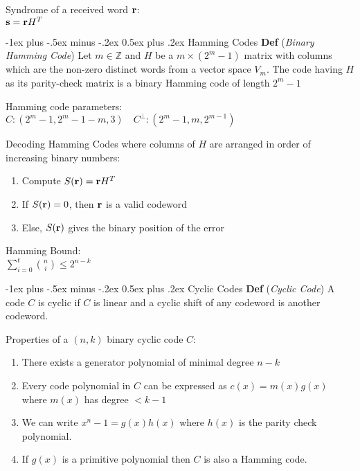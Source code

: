 \documentclass[12pt,landscape]{article}
\makeatletter
\renewcommand{\section}{\@startsection{section}{1}{0mm}%
                                {-1ex plus -.5ex minus -.2ex}%
                                {0.5ex plus .2ex}%
                                {\normalfont\normalsize\bfseries}}
\newcommand{\tab}{\hspace{.02\textwidth}}
\newcommand{\ds}{\displaystyle}
\newcommand{\defn}[1]{\textbf{Def} (\emph{#1})}
\makeatother
\begin{document}
\begin{multicols*}{3}
Syndrome of a received word $\vb{r}$:\\
\tab $\vb{s} = \vb{r}H^T$

\section{Hamming Codes}
\defn{Binary Hamming Code} Let $m \in \mathbb{Z}$ and $H$ be a $m \times (2^m-1)$ matrix with columns which are the non-zero distinct words from a vector space $V_m$. The code having $H$ as its parity-check matrix is a binary Hamming code of length $2^m-1$

Hamming code parameters:\\
\tab $C: (2^m-1, 2^m-1-m, 3) \quad C^\perp: (2^m-1, m, 2^{m-1})$

Decoding Hamming Codes where columns of $H$ are arranged in order of increasing binary numbers:
\vspace{-0.5em}
\begin{enumerate}[itemsep=0em]
	\item Compute $S(\vb{r}) = \vb{r}H^T$
	\item If $S(\vb{r}) = 0$, then $\vb{r}$ is a valid codeword
	\item Else, $S(\vb{r})$ gives the binary position of the error 
\end{enumerate}

Hamming Bound:\\
\tab $\ds \sum_{i=0}^{t} {n \choose i} \leq 2^{n-k}$

\section{Cyclic Codes}
\defn{Cyclic Code} A code $C$ is cyclic if $C$ is linear and a cyclic shift of any codeword is another codeword.

Properties of a $(n,k)$ binary cyclic code $C$:\\
\vspace{-0.5em}
\begin{enumerate}[itemsep=0em]
	\item There exists a generator polynomial of minimal degree $n-k$
	\item Every code polynomial in $C$ can be expressed as $c(x) = m(x)g(x)$ where $m(x)$ has degree $< k-1$
	\item We can write $x^n-1 = g(x)h(x)$ where $h(x)$ is the parity check polynomial.
	\item If $g(x)$ is a primitive polynomial then $C$ is also a Hamming code.
\end{enumerate}


\end{multicols*}
\end{document}
